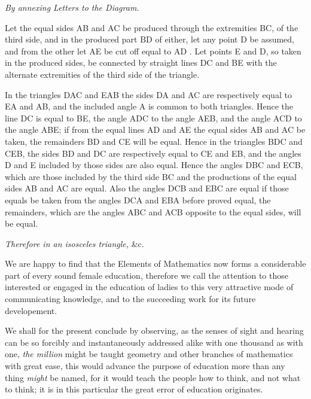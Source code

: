 \documentclass{byrne-book}
\begin{document}
\qedNB

\begin{center}
\emph{By annexing Letters to the Diagram.}
\end{center}

Let the equal sides AB and AC be produced through the extremities BC, of the third side, and in the produced part BD of either, let any point D be assumed, and from the other let AE be cut off equal to AD . Let points E and D, so taken in the produced sides, be connected by straight lines DC and BE with the alternate extremities of the third side of the triangle.

In the triangles DAC and EAB the sides DA and AC are respectively equal to EA and AB, and the included angle A is common to both triangles. Hence  the line DC is equal to BE, the angle ADC to the angle AEB, and the angle ACD to the angle ABE; if from the equal lines AD and AE the equal sides AB and AC be taken, the remainders BD and CE will be equal. Hence in the triangles BDC and CEB, the sides BD and DC are respectively equal to CE and EB, and the angles D and E included by those sides are also equal. Hence  the angles DBC and ECB, which are those included by the third side BC and the productions of the equal sides AB and AC are equal. Also the angles DCB and EBC are equal if those equals be taken from the angles DCA and EBA before proved equal, the remainders, which are the angles ABC and ACB opposite to the equal sides, will be equal.

\emph{Therefore in an isosceles triangle,} \&c.

\qedNB


We are happy to find that the Elements of Mathematics now forms a considerable part of every sound female education, therefore we call the attention to those interested or engaged in the education of ladies to this very attractive mode of communicating knowledge, and to the succeeding work for its future developement.

We shall for the present conclude by observing, as the senses of sight and hearing can be so forcibly and instantaneously addressed alike with one thousand as with one, \emph{the million} might be taught geometry and other branches of mathematics with great ease, this would advance the purpose of education more than any thing \emph{might} be named, for it would teach the people how to think, and not what to think; it is in this particular the great error of education originates.
\end{document}

